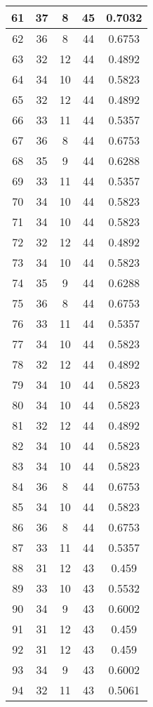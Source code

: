 \documentclass[letterpaper, 12pt]{article}
\begin{document}
\begin{longtable}{|c|c|c|c|c|}
\hline
61 & 37 & 8 & 45 & 0.7032 \\
\hline
62 & 36 & 8 & 44 & 0.6753 \\
\hline
63 & 32 & 12 & 44 & 0.4892 \\
\hline
64 & 34 & 10 & 44 & 0.5823 \\
\hline
65 & 32 & 12 & 44 & 0.4892 \\
\hline
66 & 33 & 11 & 44 & 0.5357 \\
\hline
67 & 36 & 8 & 44 & 0.6753 \\
\hline
68 & 35 & 9 & 44 & 0.6288 \\
\hline
69 & 33 & 11 & 44 & 0.5357 \\
\hline
70 & 34 & 10 & 44 & 0.5823 \\
\hline
71 & 34 & 10 & 44 & 0.5823 \\
\hline
72 & 32 & 12 & 44 & 0.4892 \\
\hline
73 & 34 & 10 & 44 & 0.5823 \\
\hline
74 & 35 & 9 & 44 & 0.6288 \\
\hline
75 & 36 & 8 & 44 & 0.6753 \\
\hline
76 & 33 & 11 & 44 & 0.5357 \\
\hline
77 & 34 & 10 & 44 & 0.5823 \\
\hline
78 & 32 & 12 & 44 & 0.4892 \\
\hline
79 & 34 & 10 & 44 & 0.5823 \\
\hline
80 & 34 & 10 & 44 & 0.5823 \\
\hline
81 & 32 & 12 & 44 & 0.4892 \\
\hline
82 & 34 & 10 & 44 & 0.5823 \\
\hline
83 & 34 & 10 & 44 & 0.5823 \\
\hline
84 & 36 & 8 & 44 & 0.6753 \\
\hline
85 & 34 & 10 & 44 & 0.5823 \\
\hline
86 & 36 & 8 & 44 & 0.6753 \\
\hline
87 & 33 & 11 & 44 & 0.5357 \\
\hline
88 & 31 & 12 & 43 & 0.459 \\
\hline
89 & 33 & 10 & 43 & 0.5532 \\
\hline
90 & 34 & 9 & 43 & 0.6002 \\
\hline
91 & 31 & 12 & 43 & 0.459 \\
\hline
92 & 31 & 12 & 43 & 0.459 \\
\hline
93 & 34 & 9 & 43 & 0.6002 \\
\hline
94 & 32 & 11 & 43 & 0.5061 \\

\end{longtable}
\end{document}
